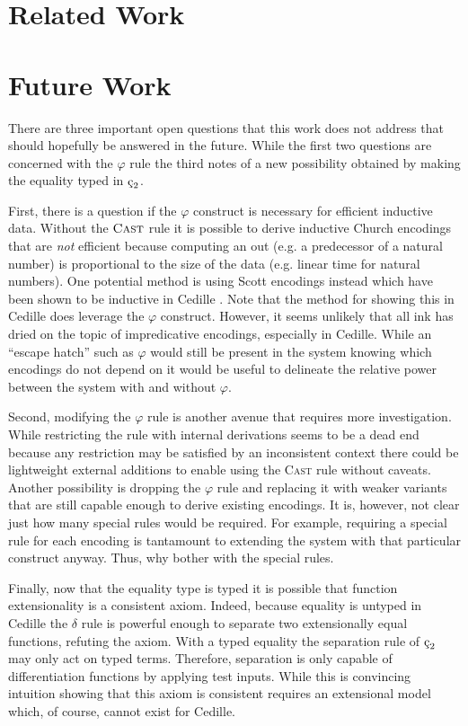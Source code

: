 \section{Related Work}




\section{Future Work}

There are three important open questions that this work does not address that should hopefully be answered in the future.
While the first two questions are concerned with the $\varphi$ rule the third notes of a new possibility obtained by making the equality typed in $\ced$.

First, there is a question if the $\varphi$ construct is necessary for efficient inductive data.
Without the $\textsc{Cast}$ rule it is possible to derive inductive Church encodings that are \textit{not} efficient because computing an out (e.g. a predecessor of a natural number) is proportional to the size of the data (e.g. linear time for natural numbers).
One potential method is using Scott encodings instead which have been shown to be inductive in Cedille \cite{jenkins2021monotone}.
Note that the method for showing this in Cedille does leverage the $\varphi$ construct.
However, it seems unlikely that all ink has dried on the topic of impredicative encodings, especially in Cedille.
While an ``escape hatch'' such as $\varphi$ would still be present in the system knowing which encodings do not depend on it would be useful to delineate the relative power between the system with and without $\varphi$.

Second, modifying the $\varphi$ rule is another avenue that requires more investigation.
While restricting the rule with internal derivations seems to be a dead end because any restriction may be satisfied by an inconsistent context there could be lightweight external additions to enable using the \textsc{Cast} rule without caveats.
Another possibility is dropping the $\varphi$ rule and replacing it with weaker variants that are still capable enough to derive existing encodings.
It is, however, not clear just how many special rules would be required.
For example, requiring a special rule for each encoding is tantamount to extending the system with that particular construct anyway.
Thus, why bother with the special rules.

Finally, now that the equality type is typed it is possible that function extensionality is a consistent axiom.
Indeed, because equality is untyped in Cedille the $\delta$ rule is powerful enough to separate two extensionally equal functions, refuting the axiom.
With a typed equality the separation rule of $\ced$ may only act on typed terms.
Therefore, separation is only capable of differentiation functions by applying test inputs.
While this is convincing intuition showing that this axiom is consistent requires an extensional model which, of course, cannot exist for Cedille.

